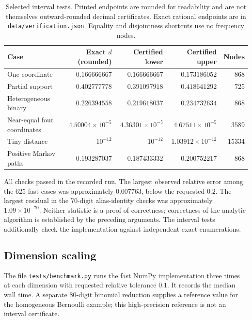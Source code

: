 \documentclass[11pt]{article}
\theoremstyle{definition}
\theoremstyle{remark}
\begin{document}
\begin{table}[htbp]
\centering\small
\begin{tabular}{@{}lrrrr@{}}
\toprule
Case & Exact $d$ (rounded) & Certified lower & Certified upper & Nodes\\
\midrule
One coordinate & $0.166666667$ & $0.166666667$ & $0.173186052$ & 868\\
Partial support & $0.402777778$ & $0.391097918$ & $0.418641292$ & 725\\
Heterogeneous binary & $0.226394558$ & $0.219618037$ & $0.234732634$ & 868\\
Near-equal four coordinates & $4.50004\!\times10^{-5}$ & $4.36301\!\times10^{-5}$ & $4.67511\!\times10^{-5}$ & 3589\\
Tiny distance & $10^{-12}$ & $10^{-12}$ & $1.03912\!\times10^{-12}$ & 15334\\
Positive Markov paths & $0.193287037$ & $0.187433332$ & $0.200752217$ & 868\\
\bottomrule
\end{tabular}
\caption{Selected interval tests. Printed endpoints are rounded for readability and are not themselves outward-rounded decimal certificates. Exact rational endpoints are in \texttt{data/verification.json}. Equality and disjointness shortcuts use no frequency nodes.}
\label{tab:interval}
\end{table}

All checks passed in the recorded run. The largest observed relative error among the 625 fast cases was approximately $0.007763$, below the requested $0.2$. The largest residual in the 70-digit alias-identity checks was approximately $1.09\times10^{-70}$. Neither statistic is a proof of correctness; correctness of the analytic algorithm is established by the preceding arguments. The interval tests additionally check the implementation against independent exact enumerations.

\subsection{Dimension scaling}

The file \texttt{tests/benchmark.py} runs the fast NumPy implementation three times at each dimension with requested relative tolerance $0.1$. It records the median wall time. A separate 80-digit binomial reduction supplies a reference value for the homogeneous Bernoulli example; this high-precision reference is not an interval certificate.
\end{document}
